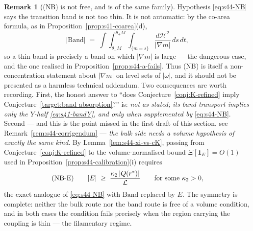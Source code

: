 \documentclass[11pt]{article}
\theoremstyle{definition}
\newtheorem{remark}[theorem]{Remark}
\theoremstyle{remark}
\begin{document}
\begin{remark}[(NB) is not free, and is of the same family]
  \label{rem:s44-NB}
  Hypothesis \eqref{eq:s44-NB} says the transition band is not too thin. It is
  not automatic: by the co-area formula, as in
  Proposition~\ref{prop:s41-coarea}(d),
  \[
    |\mathrm{Band}|
    \;=\;\int\!\!\int_{\theta_-M}^{\theta_+M}
      \int_{\{m=s\}}\frac{d\mathcal{H}^2}{|\nabla m|}\,ds\,dt ,
  \]
  so a thin band is precisely a band on which $|\nabla m|$ is large --- the
  dangerous case, and the one realised in
  Proposition~\ref{prop:s44-a-fails}. Thus (NB) is itself a non-concentration
  statement about $|\nabla m|$ on level sets of $|\omega|$, and it should not
  be presented as a harmless technical addendum. Two consequences are worth
  recording. First, the honest answer to ``does
  Conjecture~\ref{conj:K-refined} imply
  Conjecture~\ref{target:band-absorption}?'' is: \emph{not as stated; its band
  transport implies only the $Y$-half \eqref{eq:s41-bandY}, and only when
  supplemented by} \eqref{eq:s44-NB}. Second --- and this is the point missed
  in the first draft of this section, see Remark~\ref{rem:s44-corrigendum} ---
  \emph{the bulk side needs a volume hypothesis of exactly the same kind}. By
  Lemma~\ref{lem:s44-xi-vs-cK}, passing from
  Conjecture~\ref{conj:K-refined} to the volume-normalised bound
  $\Xi[\mathbf{1}_E]=O(1)$ used in
  Proposition~\ref{prop:s44-calibration}(i) requires
  \begin{equation}\label{eq:s44-NBE}
    \textup{(NB-E)}\qquad
    |E| \;\geq\;\frac{\kappa_2\,|Q(r^*)|}{\mathcal{L}}
    \qquad\text{for some }\kappa_2>0 ,
  \end{equation}
  the exact analogue of \eqref{eq:s44-NB} with $\mathrm{Band}$ replaced by
  $E$. The symmetry is complete: neither the bulk route nor the band route is
  free of a volume condition, and in both cases the condition fails precisely
  when the region carrying the coupling is thin --- the filamentary regime.
\end{remark}
\end{document}
